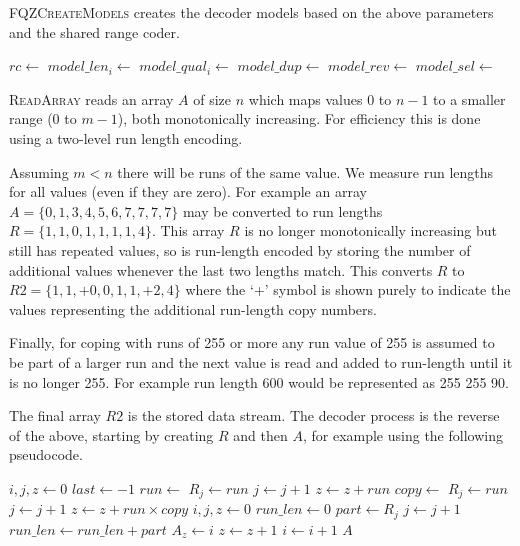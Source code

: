 \documentclass[a4paper]{article}
\begin{document}
\textsc{FQZCreateModels} creates the decoder models based on the above
parameters and the shared range coder.

\begin{program}[H]
\begin{algorithmic}[1]
  \State $rc \gets $
    \State $model\_len_i \gets $
  \EndFor
    \State $model\_qual_i \gets $
  \EndFor
  \State $model\_dup \gets $
  \State $model\_rev \gets $
    \State $model\_sel \gets $
  \EndIf
\EndProcedure
\end{algorithmic}
\end{program}

\textsc{ReadArray} reads an array $A$ of size $n$ which maps values 0
to $n-1$ to a smaller range (0 to $m-1$), both monotonically
increasing.  For efficiency this is done using a two-level run length
encoding.

Assuming $m < n$ there will be runs of the same value.  We measure run
lengths for all values (even if they are zero).  For example an array
$A = \{0,1,3,4,5,6,7,7,7,7\}$ may be converted to run lengths $R =
\{1,1,0,1,1,1,1,4\}$.  This array $R$ is no longer monotonically
increasing but still has repeated values, so is run-length encoded by
storing the number of additional values whenever the last two lengths
match.  This converts $R$ to $R2 = \{1, 1, +0, 0, 1, 1, +2, 4\}$ where
the `+' symbol is shown purely to indicate the values representing the
additional run-length copy numbers.

Finally, for coping with runs of 255 or more any run value of 255 is
assumed to be part of a larger run and the next value is read and
added to run-length until it is no longer 255.  For example run length
600 would be represented as 255 255 90.

The final array $R2$ is the stored data stream.  The decoder process
is the reverse of the above, starting by creating $R$ and then $A$,
for example using the following pseudocode.

\begin{algorithmic}[1]
\State $i,j,z \gets 0$
\State $last \gets -1$
 
  \State $run \gets $ 
  \State $R_j \gets run$
  \State $j \gets j+1$
  \State $z \gets z + run$
    \State $copy \gets $ 
      \State $R_j \gets run$
      \State $j \gets j+1$
    \EndFor
    \State $z \gets z + run \times copy$
  \EndIf
\EndWhile
\Statex
\State $i,j,z \gets 0$
 
  \State $run\_len \gets 0$
  \Repeat
    \State $part \gets R_j$
    \State $j \gets j + 1$
    \State $run\_len \gets run\_len + part$
    \State $A_z \gets i$
    \State $z \gets z+1$
  \EndFor
  \State $i \gets i+1$
\EndWhile
\Statex
\State \Return $A$
\EndFunction
\end{algorithmic}
\end{document}
